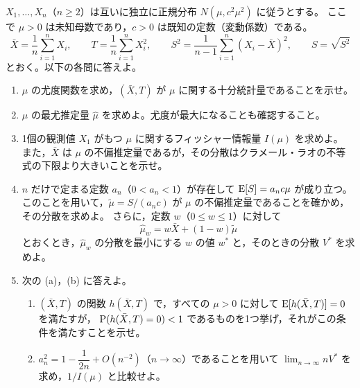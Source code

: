 \documentclass[a4paper,11pt]{ltjsarticle}
\begin{document}
$X_1,\ldots,X_n$（$n\ge2$）は互いに独立に正規分布 $N(\mu,c^2\mu^2)$ に従うとする。
ここで $\mu>0$ は未知母数であり，$c>0$ は既知の定数（変動係数）である。
\[
\bar X=\frac1n\sum_{i=1}^nX_i,\qquad
T=\frac1n\sum_{i=1}^nX_i^2,\qquad
S^2=\frac1{n-1}\sum_{i=1}^n(X_i-\bar X)^2,\qquad S=\sqrt{S^2}
\]
とおく。以下の各問に答えよ。
\begin{enumerate}
\item $\mu$ の尤度関数を求め，$(\bar X,T)$ が $\mu$ に関する十分統計量であることを示せ。
\item $\mu$ の最尤推定量 $\hat\mu$ を求めよ。尤度が最大になることも確認すること。
\item 1個の観測値 $X_1$ がもつ $\mu$ に関するフィッシャー情報量 $I(\mu)$ を求めよ。
また，$\bar X$ は $\mu$ の不偏推定量であるが，その分散はクラメール・ラオの不等式の下限より大きいことを示せ。
\item $n$ だけで定まる定数 $a_n$（$0<a_n<1$）が存在して $\operatorname{E}[S]=a_nc\mu$ が成り立つ。
このことを用いて，$\tilde\mu=S/(a_nc)$ が $\mu$ の不偏推定量であることを確かめ，その分散を求めよ。
さらに，定数 $w$（$0\le w\le1$）に対して
\[
\hat\mu_w=w\bar X+(1-w)\tilde\mu
\]
とおくとき，$\hat\mu_w$ の分散を最小にする $w$ の値 $w^*$ と，そのときの分散 $V^*$ を求めよ。
\item 次の (a)，(b) に答えよ。
\begin{enumerate}[label=(\alph*),leftmargin=2em,itemsep=0.3em,topsep=0.3em]
\item $(\bar X,T)$ の関数 $h(\bar X,T)$ で，すべての $\mu>0$ に対して $\operatorname{E}[h(\bar X,T)]=0$ を満たすが，
$\operatorname{P}(h(\bar X,T)=0)<1$ であるものを1つ挙げ，それがこの条件を満たすことを示せ。
\item $a_n^2=1-\dfrac{1}{2n}+O(n^{-2})$（$n\to\infty$）であることを用いて $\displaystyle\lim_{n\to\infty}nV^*$ を求め，$1/I(\mu)$ と比較せよ。
\end{enumerate}
\end{enumerate}
\newpage
\end{document}
